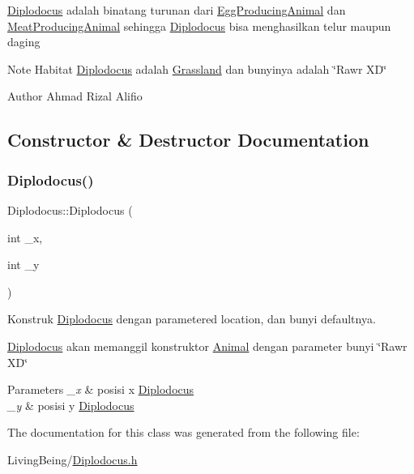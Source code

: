 \mbox{\hyperlink{classDiplodocus}{Diplodocus}} adalah binatang turunan dari \mbox{\hyperlink{classEggProducingAnimal}{Egg\+Producing\+Animal}} dan \mbox{\hyperlink{classMeatProducingAnimal}{Meat\+Producing\+Animal}} sehingga \mbox{\hyperlink{classDiplodocus}{Diplodocus}} bisa menghasilkan telur maupun daging

\begin{DoxyNote}{Note}
Habitat \mbox{\hyperlink{classDiplodocus}{Diplodocus}} adalah \mbox{\hyperlink{classGrassland}{Grassland}} dan bunyinya adalah \char`\"{}\+Rawr X\+D\char`\"{}
\end{DoxyNote}
\begin{DoxyAuthor}{Author}
Ahmad Rizal Alifio 
\end{DoxyAuthor}


\subsection{Constructor \& Destructor Documentation}
\mbox{\label{classDiplodocus_a2cd0b6edd66f2bbacb3b8eb141836901}} 
\subsubsection{\texorpdfstring{Diplodocus()}{Diplodocus()}}
{\footnotesize\ttfamily Diplodocus\+::\+Diplodocus (\begin{DoxyParamCaption}\item[{int}]{\+\_\+x,  }\item[{int}]{\+\_\+y }\end{DoxyParamCaption})}



Konstruk \mbox{\hyperlink{classDiplodocus}{Diplodocus}} dengan parametered location, dan bunyi defaultnya. 

\mbox{\hyperlink{classDiplodocus}{Diplodocus}} akan memanggil konstruktor \mbox{\hyperlink{classAnimal}{Animal}} dengan parameter bunyi \char`\"{}\+Rawr X\+D\char`\"{}


\begin{DoxyParams}{Parameters}
{\em \+\_\+x} & posisi x \mbox{\hyperlink{classDiplodocus}{Diplodocus}} \\
\hline
{\em \+\_\+y} & posisi y \mbox{\hyperlink{classDiplodocus}{Diplodocus}} \\
\hline
\end{DoxyParams}


The documentation for this class was generated from the following file\+:\begin{DoxyCompactItemize}
\item 
Living\+Being/\mbox{\hyperlink{Diplodocus_8h}{Diplodocus.\+h}}\end{DoxyCompactItemize}
